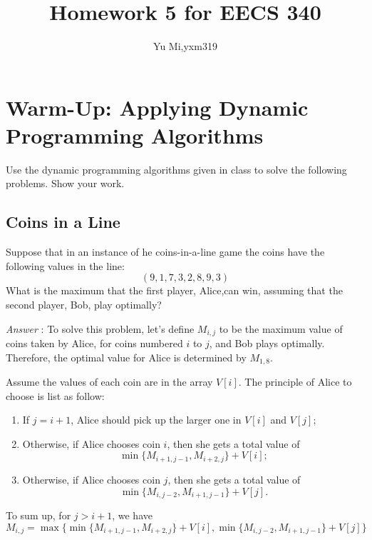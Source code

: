 \documentclass[11pt]{article}
\begin{document}
	\title{Homework 5 for EECS 340}
	\author{Yu Mi,yxm319}
	\maketitle
\section{Warm-Up: Applying Dynamic Programming Algorithms}
Use the dynamic programming algorithms given in class to solve the following problems. Show your work.
\subsection{Coins in a Line}
Suppose that in an instance of he coins-in-a-line game the coins have the following values in the line:
$$(9,1,7,3,2,8,9,3)$$
What is the maximum that the first player, Alice,can win, assuming that the second player, Bob, play optimally?

\noindent \emph{Answer} :
To solve this problem, let's define $M_{i,j}$ to be the maximum value of coins taken by Alice, for coins numbered $i$ to $j$, and Bob plays optimally. Therefore, the optimal value for Alice is determined by $M_{1,8}$.

Assume the values of each coin are in the array $V[i]$. The principle of Alice to choose is list as follow:

\begin{enumerate}
	\item If $j=i+1$, Alice should pick up the larger one in $V[i]$ and $V[j]$;
	\item Otherwise, if Alice chooses coin $i$, then she gets a total value of $$\min\{M_{i+1,j-1},M_{i+2,j}\}+V[i];$$
	\item Otherwise, if Alice chooses coin $j$, then she gets a total value of $$\min\{M_{i,j-2},M_{i+1,j-1}\}+V[j].$$
\end{enumerate}

To sum up, for $j>i+1$, we have $$M_{i,j}=\max\{\min\{M_{i+1,j-1},M_{i+2,j}\}+V[i],\min\{M_{i,j-2},M_{i+1,j-1}\}+V[j]\}$$
\end{document}
